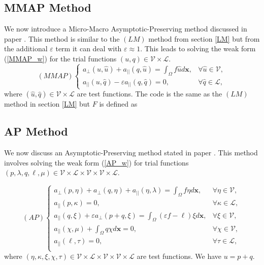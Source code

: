 \documentclass[12pt]{ociamthesis}
\begin{document}
\subsection{MMAP Method} \label{MMAP}
We now introduce a Micro-Macro Asymptotic-Preserving method discussed in paper \cite{MMAP}. This method is similar to the $(LM)$ method from section \ref{LM} but from the additional $\varepsilon$ term it can deal with $\varepsilon \approx 1$. This leads to solving the weak form (\ref{MMAP_w}) for the trial functions $(u, q) \in  \mathcal{V} \times \mathcal{L}$. 
\begin{equation} \label{MMAP_w}
(MMAP)
\begin{cases}
a_{\perp}(u, \hat{u}) + a_{||}(q, \hat{u}) = \int_{\Omega} f \hat{u} d\mathbf{x}, 
&\forall \hat{u} \in \mathcal{V}, \\
a_{||}(u, \hat{q}) - \varepsilon a_{||}(q, \hat{q}) = 0, 
&\forall \hat{q} \in \mathcal{L},
\end{cases}
\end{equation}
where $(\hat{u}, \hat{q}) \in \mathcal{V}\times \mathcal{L} $ are test functions. The code is the same as the $(LM)$ method in section \ref{LM} but $F$ is defined as 


\subsection{AP Method} \label{AP}
We now discuss an Asymptotic-Preserving method stated in paper \cite{AP}. This method involves solving the weak form (\ref{AP_w}) for trial functions $(p, \lambda, q, \ell, \mu) \in \mathcal{V} \times \mathcal{L}  \times \mathcal{V}  \times \mathcal{V}  \times \mathcal{L}$.

\begin{equation} \label{AP_w}
(AP)
\begin{cases}
a_{\perp}(p, \eta)+a_{\perp}(q, \eta) + a_{||}(\eta, \lambda) = \int_{\Omega}f \eta d\mathbf{x},
&\forall \eta \in \mathcal{V},\\
a_{||}(p, \kappa) = 0, 
&\forall \kappa \in \mathcal{L},\\
a_{||}(q, \xi) + \varepsilon a_{\perp}(p+q, \xi) = 
\int_{\Omega} (\varepsilon f -\ell)\xi d\mathbf{x},
&\forall \xi \in \mathcal{V},\\
a_{||}(\chi, \mu) + \int_{\Omega}q \chi d\mathbf{x} = 0,
&\forall \chi \in \mathcal{V},\\
a_{||}(\ell, \tau) = 0,
&\forall \tau \in \mathcal{L},\\
\end{cases}
\end{equation}
where $(\eta, \kappa, \xi, \chi, \tau)\in \mathcal{V} \times \mathcal{L}  \times \mathcal{V}  \times \mathcal{V}  \times \mathcal{L}$ are test functions. We have $u=p+q$.
\end{document}
